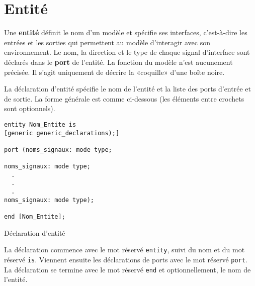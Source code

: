 \documentclass[letter, oneside]{book}
\begin{document}
\section{Entité}
\label{sec:orga1e6ad9}

Une \textbf{entité} définit le nom d'un modèle et spécifie ses interfaces,
c'est-à-dire les entrées et les sorties qui permettent au modèle
d'interagir avec son environnement. Le nom, la direction et le type
de chaque signal d'interface sont déclarés dans le \textbf{port} de
l'entité. La fonction du modèle n'est aucunement précisée. Il s'agit
uniquement de décrire la «coquille» d'une boîte noire.

La déclaration d'entité spécifie le nom de l'entité et la liste des
ports d'entrée et de sortie. La forme générale est comme ci-dessous (les
éléments entre crochets sont optionnels). 

\begin{listing}[htbp]
\begin{verbatim}
entity Nom_Entite is 
[generic generic_declarations);]

port (noms_signaux: mode type;

noms_signaux: mode type;
  .
  .
  .
noms_signaux: mode type);

end [Nom_Entite];
\end{verbatim}
\caption{Déclaration d'entité}
\end{listing}

La déclaration commence avec le mot réservé \texttt{entity}, suivi du nom et
du mot réservé \texttt{is}. Viennent ensuite les déclarations de ports avec le
mot réservé \texttt{port}. La déclaration se termine avec le mot réservé
\texttt{end} et optionnellement, le nom de l'entité.
\end{document}
